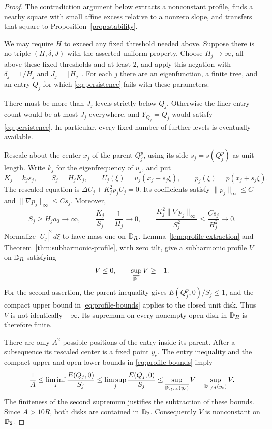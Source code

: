 \begin{proof}
The contradiction argument below extracts a nonconstant profile,
finds a nearby square with small affine excess relative to a nonzero
slope, and transfers that square to Proposition~\ref{prop:stability}.

We may require $H$ to exceed any fixed threshold needed above. Suppose
there is no triple $(H,\delta,J)$ with the asserted uniform property.
Choose $H_j\to\infty$, all above these fixed thresholds and at least
$2$, and apply this negation with
$\delta_j=1/H_j$ and $J_j=\lceil H_j\rceil$. For each $j$ there are an
eigenfunction, a finite tree, and an entry $Q_j$ for which
\eqref{eq:persistence} fails with these parameters.

There must be more than $J_j$ levels strictly below $Q_j$. Otherwise the
finer-entry count would be at most $J_j$ everywhere, and $Y_{Q_j}=Q_j$
would satisfy \eqref{eq:persistence}. In particular, every fixed number
of further levels is eventually available.

Rescale about the center $x_j$ of the parent $Q_j^p$, using its side
$s_j=s(Q_j^p)$ as unit length. Write $k_j$ for the eigenfrequency of
$u_j$, and put
\[
 K_j=k_js_j,\qquad S_j=H_jK_j,\qquad
 U_j(\xi)=u_j(x_j+s_j\xi),\qquad
 p_j(\xi)=p(x_j+s_j\xi).
\]
The rescaled equation is
$\Delta U_j+K_j^2p_jU_j=0$. Its coefficients satisfy
$\|p_j\|_\infty\le C$ and $\|\nabla p_j\|_\infty\le Cs_j$.
Moreover,
\[
 S_j\ge H_ja_0\longrightarrow\infty,
 \qquad \frac{K_j}{S_j}=\frac1{H_j}\longrightarrow0,
 \qquad
 \frac{K_j^2\|\nabla p_j\|_\infty}{S_j^2}
 \le\frac{Cs_j}{H_j^2}\longrightarrow0.
\]
Normalize $|U_j|^2\,d\xi$ to have mass one on $\mathbb D_R$.
Lemma~\ref{lem:profile-extraction} and
Theorem~\ref{thm:subharmonic-profile}, with zero tilt, give a
subharmonic profile $V$ on $\mathbb D_R$ satisfying
\[
 V\le0,\qquad \sup_{\overline{\mathbb D_1}}V\ge-1.
\]
For the second assertion, the parent inequality gives
$E(Q_j^p,0)/S_j\le1$, and the compact upper bound in
\eqref{eq:profile-bounds} applies to the closed unit disk. Thus $V$ is
not identically $-\infty$. Its supremum on every nonempty open disk in
$\mathbb D_R$ is therefore finite.

There are only $A^2$ possible positions of the entry inside its parent.
After a subsequence its rescaled center is a fixed point $y_e$. The
entry inequality and the compact upper and open lower bounds in
\eqref{eq:profile-bounds} imply
\[
 \frac1A
 \le \liminf_j\frac{E(Q_j,0)}{S_j}
 \le \limsup_j\frac{E(Q_j,0)}{S_j}
 \le
 \sup_{\overline{\mathbb D_{R/A}(y_e)}}V
       -\sup_{\mathbb D_{1/A}(y_e)}V.
\]
The finiteness of the second supremum justifies the subtraction of
these bounds. Since $A>10R$, both disks are contained in $\mathbb D_2$.
Consequently $V$ is nonconstant on $\mathbb D_2$.


\end{proof}
